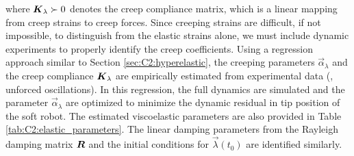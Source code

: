 %
\noindent where $\boldsymbol{K}_\lambda \succ 0$ denotes the creep compliance matrix, which is a linear mapping from creep strains to creep forces. Since creeping strains are difficult, if not impossible, to distinguish from the elastic strains alone, we must include dynamic experiments to properly identify the creep coefficients. Using a regression approach similar to Section \ref{sec:C2:hyperelastic}, the creeping parameters $\vec{\alpha}_\lambda$ and the creep compliance $\boldsymbol{K}_\lambda$ are empirically estimated from experimental data (\eg, unforced oscillations). In this regression, the full dynamics are simulated and the parameter $\vec{\alpha}_\lambda$ are optimized to minimize the dynamic residual in tip position of the soft robot. The estimated viscoelastic parameters are also provided in Table \ref{tab:C2:elastic_parameters}. The linear damping parameters from the Rayleigh damping matrix $\boldsymbol{R}$ and the initial conditions for $\vec{\lambda}(t_0)$ are identified similarly.

